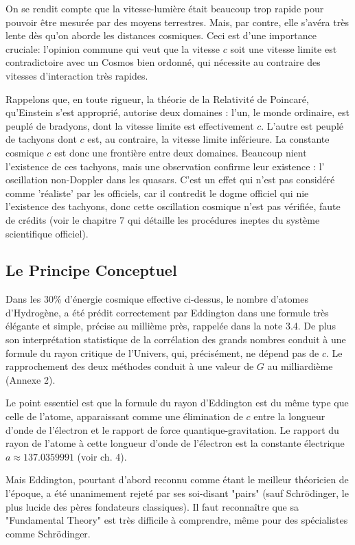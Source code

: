\documentclass[a4paper,12pt]{article}
\begin{document}
On se rendit compte que la vitesse-lumière était beaucoup trop rapide pour pouvoir être mesurée par des moyens terrestres. Mais, par contre, elle s'avéra très lente dès qu'on aborde les distances cosmiques. Ceci est d'une importance cruciale: l'opinion commune qui veut que la vitesse $c$ soit une vitesse limite est contradictoire avec un Cosmos bien ordonné, qui nécessite au contraire des vitesses d'interaction très rapides.

Rappelons que, en toute rigueur, la théorie de la Relativité de Poincaré, qu'Einstein s'est approprié, autorise deux domaines : l'un, le monde ordinaire, est peuplé de bradyons, dont la vitesse limite est effectivement $c$. L'autre est peuplé de tachyons dont $c$ est, au contraire, la vitesse limite inférieure. La constante cosmique $c$ est donc une frontière entre deux domaines. Beaucoup nient l'existence de ces tachyons, mais une observation confirme leur existence : l' oscillation non-Doppler dans les quasars. C'est un effet qui n'est pas considéré comme 'réaliste' par les officiels, car il contredit le dogme officiel qui nie l'existence des tachyons, donc cette oscillation cosmique n'est pas vérifiée, faute de crédits (voir le chapitre 7 qui détaille les procédures ineptes du système scientifique officiel).

\subsection{Le Principe Conceptuel}
 

Dans les 30\% d'énergie cosmique effective ci-dessus, le nombre d'atomes d'Hydrogène, a été prédit correctement par Eddington dans une formule très élégante et simple, précise au millième près, rappelée dans la note 3.4. De plus son interprétation statistique de la corrélation des grands nombres conduit à une formule du rayon critique de l'Univers, qui, précisément, ne dépend pas de $c$. Le rapprochement des deux méthodes conduit à une valeur de $G$ au milliardième (Annexe 2).

Le point essentiel est que la formule du rayon d'Eddington est du même type que celle de l'atome, apparaissant comme une élimination de $c$ entre la longueur d'onde de l'électron et le rapport de force quantique-gravitation. Le rapport du rayon de l'atome à cette longueur d'onde de l'électron est la constante électrique $a \approx 137.0359991$ (voir ch. 4).
  
Mais Eddington, pourtant d'abord reconnu comme étant le meilleur théoricien de l'époque, a été unanimement rejeté par ses soi-disant "pairs" (sauf Schrödinger, le plus lucide des pères fondateurs classiques). Il faut reconnaître que sa "Fundamental Theory" est très difficile à comprendre, même pour des spécialistes comme Schrödinger. 
\end{document}
